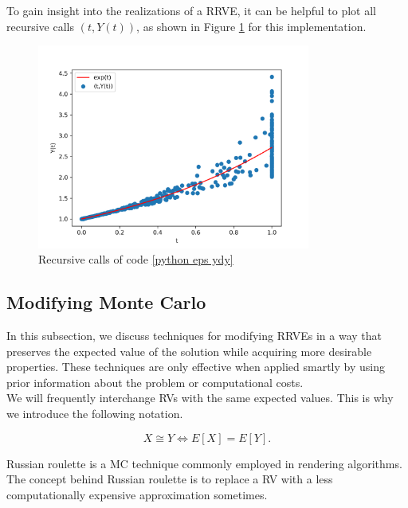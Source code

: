 \documentclass[a4paper,12pt]{article}
\begin{document}
\begin{pythonn} \label{python eps ydy}
    To gain insight into the realizations of a RRVE, it can be helpful to plot
    all recursive calls $(t,Y(t))$, as shown in Figure \ref{fig:intro example}
    for this implementation.

    \begin{figure}[h!]
        \centering
        \includegraphics[width=0.8\textwidth]{plots/intro example.png}
        \caption{Recursive calls of code \ref{python eps ydy}}
        \label{fig:intro example}
    \end{figure}
\end{pythonn}

\subsection{Modifying Monte Carlo}

In this subsection, we discuss techniques for modifying RRVEs
in a way that preserves the expected value of the solution while
acquiring more desirable properties. These techniques are only
effective when applied smartly by using prior information
about the problem or computational costs. \\

We will frequently interchange RVs with the same expected values.
This is why we introduce the following notation.
\begin{notation}[$\cong$]
    \[
        X \cong Y \iff E[X]=E[Y]
        .\]
\end{notation}

Russian roulette is a MC technique commonly employed in rendering algorithms.
The concept behind Russian roulette is to replace a RV with a
less computationally expensive approximation sometimes.
\end{document}
